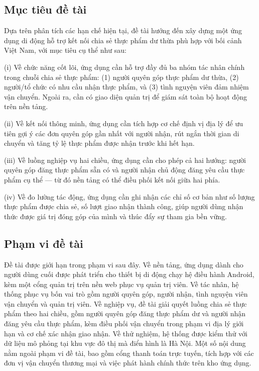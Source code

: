 \documentclass[../main.tex]{subfiles}%
\begin{document}
\subsection{Mục tiêu đề tài}
\label{subsection:1.2.3}

Dựa trên phân tích các hạn chế hiện tại, đề tài hướng đến xây dựng một ứng dụng di động hỗ trợ kết nối chia sẻ thực phẩm dư thừa phù hợp với bối cảnh Việt Nam, với mục tiêu cụ thể như sau:

(i) Về chức năng cốt lõi, ứng dụng cần hỗ trợ đầy đủ ba nhóm tác nhân chính trong chuỗi chia sẻ thực phẩm: (1) người quyên góp thực phẩm dư thừa, (2) người/tổ chức có nhu cầu nhận thực phẩm, và (3) tình nguyện viên đảm nhiệm vận chuyển. Ngoài ra, cần có giao diện quản trị để giám sát toàn bộ hoạt động trên nền tảng.

(ii) Về kết nối thông minh, ứng dụng cần tích hợp cơ chế định vị địa lý để ưu tiên gợi ý các đơn quyên góp gần nhất với người nhận, rút ngắn thời gian di chuyển và tăng tỷ lệ thực phẩm được nhận trước khi hết hạn.

(iii) Về luồng nghiệp vụ hai chiều, ứng dụng cần cho phép cả hai hướng: người quyên góp đăng thực phẩm sẵn có và người nhận chủ động đăng yêu cầu thực phẩm cụ thể — từ đó nền tảng có thể điều phối kết nối giữa hai phía.

(iv) Về đo lường tác động, ứng dụng cần ghi nhận các chỉ số cơ bản như số lượng thực phẩm được chia sẻ, số lượt giao nhận thành công, giúp người dùng nhận thức được giá trị đóng góp của mình và thúc đẩy sự tham gia bền vững.

\subsection{Phạm vi đề tài}
\label{subsection:1.2.4}

Đề tài được giới hạn trong phạm vi sau đây. Về nền tảng, ứng dụng dành cho người dùng cuối được phát triển cho thiết bị di động chạy hệ điều hành Android, kèm một cổng quản trị trên nền web phục vụ quản trị viên. Về tác nhân, hệ thống phục vụ bốn vai trò gồm người quyên góp, người nhận, tình nguyện viên vận chuyển và quản trị viên. Về nghiệp vụ, đề tài giải quyết luồng chia sẻ thực phẩm theo hai chiều, gồm người quyên góp đăng thực phẩm dư và người nhận đăng yêu cầu thực phẩm, kèm điều phối vận chuyển trong phạm vi địa lý giới hạn và cơ chế xác nhận giao nhận. Về thử nghiệm, hệ thống được kiểm thử với dữ liệu mô phỏng tại khu vực đô thị mà điển hình là Hà Nội. Một số nội dung nằm ngoài phạm vi đề tài, bao gồm cổng thanh toán trực tuyến, tích hợp với các đơn vị vận chuyển thương mại và việc phát hành chính thức trên kho ứng dụng.
\end{document}
